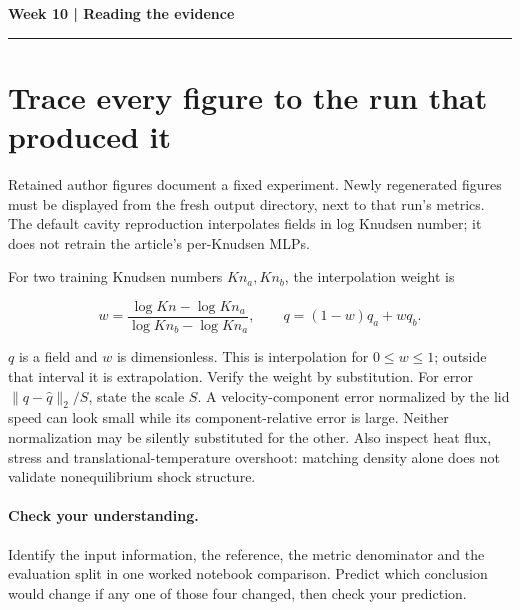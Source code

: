 \documentclass[11pt]{article}
\begin{document}
\noindent\textbf{Week 10 | Reading the evidence}\par\medskip\hrule\medskip
\section*{Trace every figure to the run that produced it}
Retained author figures document a fixed experiment. Newly regenerated figures
must be displayed from the fresh output directory, next to that run's metrics.
The default cavity reproduction interpolates fields in log Knudsen number; it
does not retrain the article's per-Knudsen MLPs.

For two training Knudsen numbers $Kn_a,Kn_b$, the interpolation weight is

\[w=\frac{\log Kn-\log Kn_a}{\log Kn_b-\log Kn_a},\qquad
q=(1-w)q_a+wq_b.\]

$q$ is a field and $w$ is dimensionless. This is interpolation for $0\le w\le1$;
outside that interval it is extrapolation. Verify the weight by substitution.
For error $\|q-\hat q\|_2/S$, state the scale $S$. A velocity-component error
normalized by the lid speed can look small while its component-relative error
is large. Neither normalization may be silently substituted for the other.
Also inspect heat flux, stress and translational-temperature overshoot: matching
density alone does not validate nonequilibrium shock structure.
\paragraph{Check your understanding.}
Identify the input information, the reference, the metric denominator and the
evaluation split in one worked notebook comparison. Predict which conclusion
would change if any one of those four changed, then check your prediction.
\end{document}

